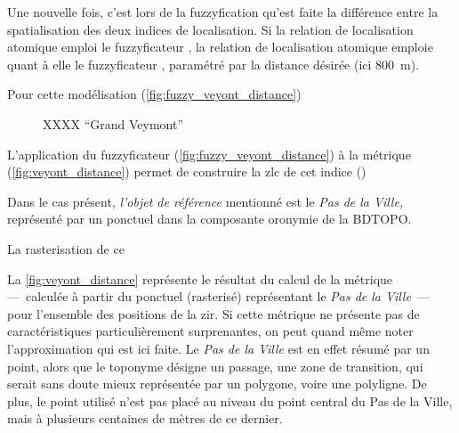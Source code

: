 Une nouvelle fois, c'est lors de la fuzzyfication qu'est faite la
différence entre la spatialisation des deux indices de
localisation. Si la relation de localisation atomique
 emploi le fuzzyficateur
, la relation de localisation atomique
 emploie quant à
elle le fuzzyficateur , paramétré par la distance
désirée (ici \SI{800}{\meter}).

Pour cette modélisation (\autoref{fig:fuzzy_veyont_distance})

\begin{figure}
  \centering
  
  \caption{XXXX \enquote{Grand Veymont}}
  \label{fig:fuzzy_veyont_distance}
\end{figure}


L’application du fuzzyficateur (\autoref{fig:fuzzy_veyont_distance}) à
la métrique (\autoref{fig:veyont_distance}) permet de construire la
\ac{zlc} de cet indice ()



Dans le cas présent, \emph{l'objet de référence} mentionné est le
\emph{Pas de la Ville,} représenté par un ponctuel dans la composante
oronymie de la BDTOPO.


La rasterisation de ce



La \autoref{fig:veyont_distance} représente le résultat du calcul de
la métrique  ---~calculée à partir du ponctuel
(rasterisé) représentant le \emph{Pas de la Ville}~--- pour l'ensemble
des positions de la \ac{zir}. Si cette métrique ne présente pas de
caractéristiques particulièrement surprenantes, on peut quand même
noter l'approximation qui est ici faite. Le \emph{Pas de la Ville} est
en effet résumé par un point, alors que le toponyme désigne un
passage, une zone de transition, qui serait sans doute mieux
représentée par un polygone, voire une polyligne. De plus, le point
utilisé n'est pas placé au niveau du point central du Pas de la Ville,
mais à plusieurs centaines de mètres de ce dernier.


